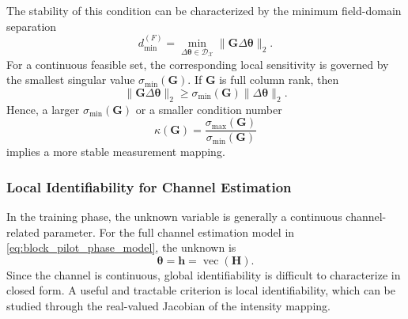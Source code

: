 \documentclass[journal]{IEEEtran}
\begin{document}
The stability of this condition can be characterized by the minimum field-domain separation
\begin{equation}
d_{\min}^{(F)}
=
\min_{\Delta\boldsymbol{\theta}\in\mathcal{D}_{\mathcal{X}}}
\|\mathbf{G}\Delta\boldsymbol{\theta}\|_2.
\label{eq:field_domain_min_distance}
\end{equation}
For a continuous feasible set, the corresponding local sensitivity is governed by the smallest singular value $\sigma_{\min}(\mathbf{G})$. 
If $\mathbf{G}$ is full column rank, then
\begin{equation}
\|\mathbf{G}\Delta\boldsymbol{\theta}\|_2
\geq
\sigma_{\min}(\mathbf{G})
\|\Delta\boldsymbol{\theta}\|_2.
\label{eq:singular_value_lower_bound}
\end{equation}
Hence, a larger $\sigma_{\min}(\mathbf{G})$ or a smaller condition number
\begin{equation}
\kappa(\mathbf{G})
=
\frac{\sigma_{\max}(\mathbf{G})}{\sigma_{\min}(\mathbf{G})}
\end{equation}
implies a more stable measurement mapping.

\subsubsection{Local Identifiability for Channel Estimation}

In the training phase, the unknown variable is generally a continuous channel-related parameter. 
For the full channel estimation model in \eqref{eq:block_pilot_phase_model}, the unknown is
\begin{equation}
\boldsymbol{\theta}=\mathbf{h}=\operatorname{vec}(\mathbf{H}).
\end{equation}
Since the channel is continuous, global identifiability is difficult to characterize in closed form. 
A useful and tractable criterion is local identifiability, which can be studied through the real-valued Jacobian of the intensity mapping.
\end{document}
